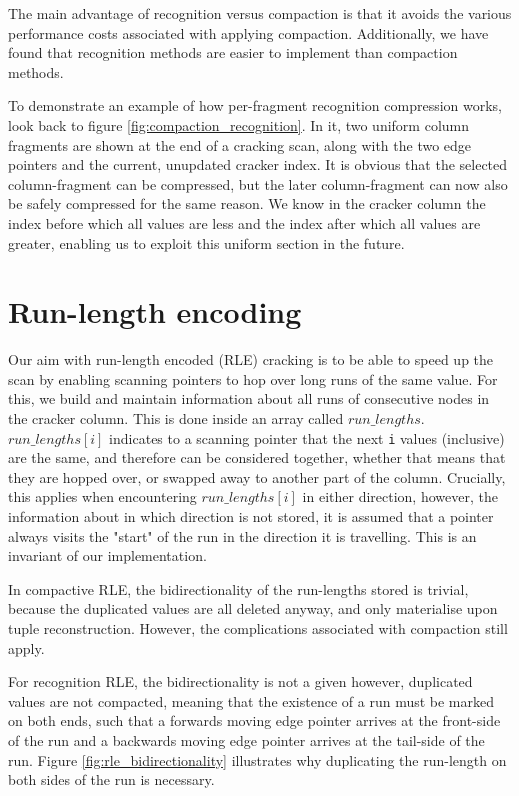 The main advantage of recognition versus compaction is that it avoids the various performance costs associated with applying compaction. Additionally, we have found that recognition methods are easier to implement than compaction methods.

To demonstrate an example of how per-fragment recognition compression works, look back to figure \ref{fig:compaction_recognition}. In it, two uniform column fragments are shown at the end of a cracking scan, along with the two edge pointers and the current, unupdated cracker index. It is obvious that the selected column-fragment can be compressed, but the later column-fragment can now also be safely compressed for the same reason. We know in the cracker column the index before which all values are less and the index after which all values are greater, enabling us to exploit this uniform section in the future.

\section{Run-length encoding}

Our aim with run-length encoded (RLE) cracking is to be able to speed up the scan by enabling scanning pointers to hop over long runs of the same value. For this, we build and maintain information about all runs of consecutive nodes in the cracker column. This is done inside an array called $run\_lengths$. $run\_lengths[i]$ indicates to a scanning pointer that the next \texttt{i} values (inclusive) are the same, and therefore can be considered together, whether that means that they are hopped over, or swapped away to another part of the column. Crucially, this applies when encountering $run\_lengths[i]$ in either direction, however, the information about in which direction is not stored, it is assumed that a pointer always visits the "start" of the run in the direction it is travelling. This is an invariant of our implementation.

In compactive RLE, the bidirectionality of the run-lengths stored is trivial, because the duplicated values are all deleted anyway, and only materialise upon tuple reconstruction. However, the complications associated with compaction still apply.

For recognition RLE, the bidirectionality is not a given however, duplicated values are not compacted, meaning that the existence of a run must be marked on both ends, such that a forwards moving edge pointer arrives at the front-side of the run and a backwards moving edge pointer arrives at the tail-side of the run. Figure \ref{fig:rle_bidirectionality} illustrates why duplicating the run-length on both sides of the run is necessary.

